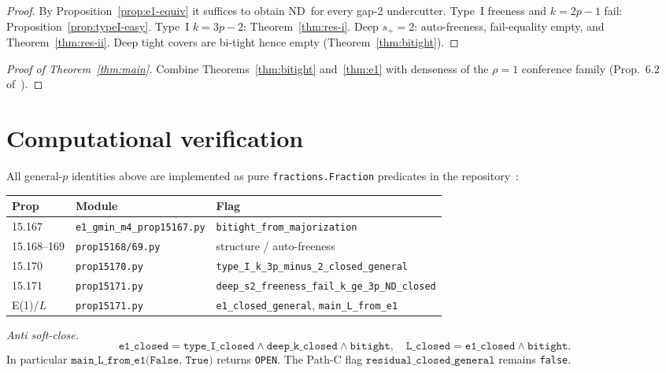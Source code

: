 \documentclass[11pt,a4paper]{article}
\theoremstyle{plain}
\theoremstyle{definition}
\newcommand{\ND}{\ensuremath{\mathrm{ND}}}
\begin{document}
\begin{proof}
By Proposition~\ref{prop:e1-equiv} it suffices to obtain \ND\ for every gap-$2$ undercutter.
Type~I freeness and $k=2p-1$ fail: Proposition~\ref{prop:typeI-easy}.
Type~I $k=3p-2$: Theorem~\ref{thm:res-i}.
Deep $s_+=2$: auto-freeness, fail-equality empty, and Theorem~\ref{thm:res-ii}.
Deep tight covers are bi-tight hence empty (Theorem~\ref{thm:bitight}).
\end{proof}

\begin{proof}[Proof of Theorem~\ref{thm:main}]
Combine Theorems~\ref{thm:bitight} and~\ref{thm:e1} with denseness of the $\rho=1$ conference
family (Prop.\ 6.2 of~\cite{solution-repo}).
\end{proof}

\section{Computational verification}

All general-$p$ identities above are implemented as pure \texttt{fractions.Fraction}
predicates in the repository~\cite{solution-repo}:
\begin{center}
\begin{tabular}{@{}llp{}@{}}
\toprule
Prop & Module & Flag \\
\midrule
15.167 & \texttt{e1\_gmin\_m4\_prop15167.py} & \texttt{bitight\_from\_majorization} \\
15.168--169 & \texttt{prop15168/69.py} & structure / auto-freeness \\
15.170 & \texttt{prop15170.py} & \texttt{type\_I\_k\_3p\_minus\_2\_closed\_general} \\
15.171 & \texttt{prop15171.py} & \texttt{deep\_s2\_freeness\_fail\_k\_ge\_3p\_ND\_closed} \\
E(1)/$L$ & \texttt{prop15171.py} & \texttt{e1\_closed\_general}, \texttt{main\_L\_from\_e1} \\
\bottomrule
\end{tabular}
\end{center}

\noindent\textit{Anti soft-close.}
\[
\texttt{e1\_closed}
=\texttt{type\_I\_closed}
\land\texttt{deep\_k\_closed}
\land\texttt{bitight},
\quad
\texttt{L\_closed}
=\texttt{e1\_closed}\land\texttt{bitight}.
\]
In particular $\texttt{main\_L\_from\_e1(False, True)}$ returns \texttt{OPEN}.
The Path-C flag $\texttt{residual\_closed\_general}$ remains \texttt{false}.
\end{document}

